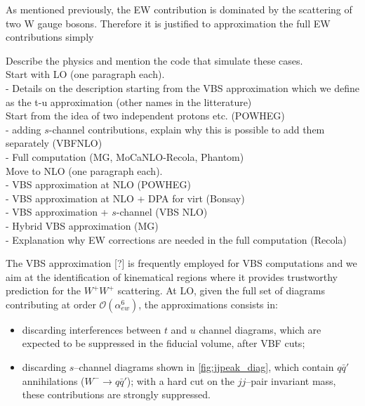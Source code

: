 As mentioned previously, the EW contribution is dominated by the scattering of two W gauge bosons.
Therefore it is justified to approximation the full EW contributions simply 


Describe the physics and mention the code that simulate these cases. \\
Start with LO (one paragraph each). \\

- Details on the description starting from the VBS approximation which we define as the t-u approximation (other names in the litterature) \\
Start from the idea of two independent protons etc. (POWHEG) \\
- adding $s$-channel contributions, explain why this is possible to add them separately (VBFNLO)\\
- Full computation (MG, MoCaNLO-Recola, Phantom) \\

Move to NLO (one paragraph each). \\

- VBS approximation at NLO (POWHEG) \\
- VBS approximation at NLO + DPA for virt (Bonsay) \\
- VBS approximation + $s$-channel (VBS NLO) \\
- Hybrid VBS approximation (MG) \\
- Explanation why EW corrections are needed in the full computation (Recola) \\


The VBS approximation [?] is frequently employed for VBS computations and we aim at the identification of kinematical regions where it provides trustworthy prediction for the $W^+W^+$ scattering.
At LO, given the full set of diagrams contributing at order $\mathcal{O}(\alpha_{ew}^6)$, the approximations consists in:
\begin{itemize}
\item discarding interferences between $t$ and $u$ channel diagrams, which are expected to be suppressed in the fiducial volume, after VBF cuts;
\item discarding $s$--channel diagrams shown in \autoref{fig:jjpeak_diag}, which contain $q\bar{q}'$ annihilations ($W^-\rightarrow q \bar{q}'$); with a hard cut on the $jj$--pair invariant mass, these contributions are strongly suppressed.
\end{itemize}
